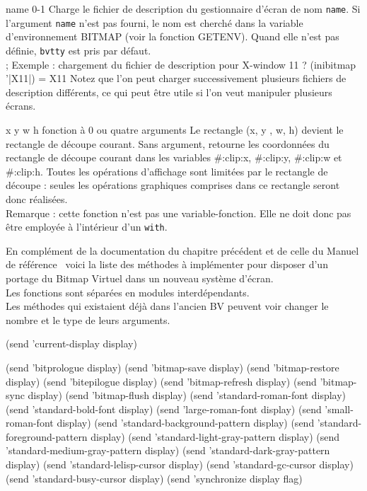 
 {name} {0-1}
Charge le fichier de description du gestionnaire d'\'{e}cran de nom {\tt name}.
Si l'argument {\tt name} n'est pas  fourni, le nom est cherch\'{e} dans la
variable d'environnement BITMAP (voir la fonction GETENV).
Quand elle n'est pas d\'{e}finie, {\tt bvtty} est pris par d\'{e}faut.\\
\BeginLL
; Exemple : chargement du fichier de description pour X-window 11
? (inibitmap '|X11|)
= X11
\EndLL
Notez que l'on peut charger successivement plusieurs fichiers de description
diff\'{e}rents, ce qui peut \^{e}tre utile si l'on veut manipuler plusieurs
\'{e}crans.


 {x y w h} {fonction \`{a} 0 ou quatre arguments}
Le rectangle (x, y , w, h) devient le rectangle de d\'{e}coupe courant.
Sans argument, retourne les coordonn\'{e}es du rectangle de d\'{e}coupe courant
dans les variables \#:clip:x, \#:clip:y, \#:clip:w et \#:clip:h.
Toutes les op\'{e}rations d'affichage sont limit\'{e}es par le rectangle de
d\'{e}coupe : seules les op\'{e}rations graphiques comprises dans ce rectangle
seront donc r\'{e}alis\'{e}es.\\
Remarque : cette fonction n'est pas une variable-fonction. Elle ne doit donc
pas \^{e}tre employ\'{e}e \`{a} l'int\'{e}rieur d'un {\tt with}.





En compl\'{e}ment de la documentation du chapitre pr\'{e}c\'{e}dent et de celle
du Manuel de r\'{e}f\'{e}rence \LeLisp\, voici la liste des m\'{e}thodes \`{a} impl\'{e}menter
pour disposer d'un portage du Bitmap Virtuel dans un nouveau syst\`{e}me
d'\'{e}cran.\\

Les fonctions sont s\'{e}par\'{e}es en modules interd\'{e}pendants.\\
Les m\'{e}thodes qui existaient d\'{e}j\`{a} dans l'ancien BV peuvent voir changer
le nombre et le type de leurs arguments.


\BeginLL
(send 'current-display display)
\EndLL



\BeginLL
(send 'bitprologue display)
(send 'bitmap-save display)
(send 'bitmap-restore display)
(send 'bitepilogue display)
(send 'bitmap-refresh display)
(send 'bitmap-sync display)
(send 'bitmap-flush display)
(send 'standard-roman-font display)
(send 'standard-bold-font display)
(send 'large-roman-font display)
(send 'small-roman-font display)
(send 'standard-background-pattern display)
(send 'standard-foreground-pattern display)
(send 'standard-light-gray-pattern display)
(send 'standard-medium-gray-pattern display)
(send 'standard-dark-gray-pattern display)
(send 'standard-lelisp-cursor display)
(send 'standard-gc-cursor display)
(send 'standard-busy-cursor display)
(send 'synchronize display flag)


